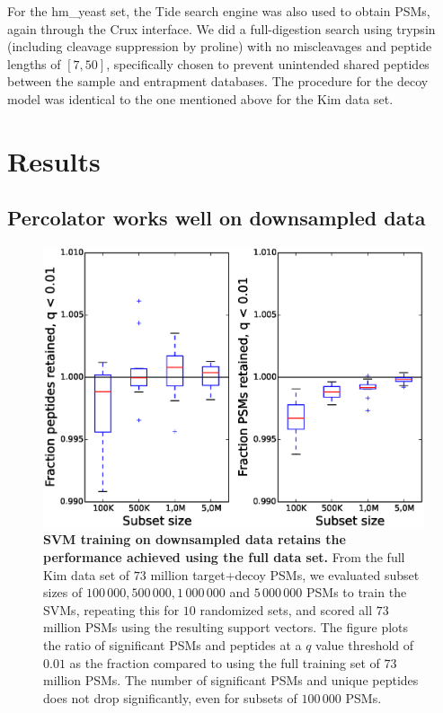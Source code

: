 \documentclass{article}
\begin{document}
For the hm\_yeast set, the Tide search engine was also used to obtain
PSMs, again through the Crux interface. We did a full-digestion search
using trypsin (including cleavage suppression by proline) with no
miscleavages and peptide lengths of $[7,50]$, specifically chosen to
prevent unintended shared peptides between the sample and entrapment
databases. The procedure for the decoy model was identical to the one 
mentioned above for the Kim data set.

\section*{Results}

\subsection*{Percolator works well on downsampled data}

\begin{figure}
\begin{center}
\includegraphics[width=0.6\linewidth]{./img/subset-performance}
\caption{\label{fig:subset}\textbf{SVM training on downsampled data
    retains the performance achieved using the full data set.}  From
  the full Kim data set of $73$ million target+decoy PSMs, we
  evaluated subset sizes of $100\,000, 500\,000, 1\,000\,000$ and
  $5\,000\,000$ PSMs to train the SVMs, repeating this for $10$
  randomized sets, and scored all $73$ million PSMs using the
  resulting support vectors. The figure plots the ratio of significant
  PSMs and peptides at a $q$ value threshold of $0.01$ as the fraction
  compared to using the full training set of $73$ million PSMs. The
  number of significant PSMs and unique peptides does not drop
  significantly, even for subsets of $100\,000$ PSMs.}
\end{center}
\end{figure}
\end{document}
